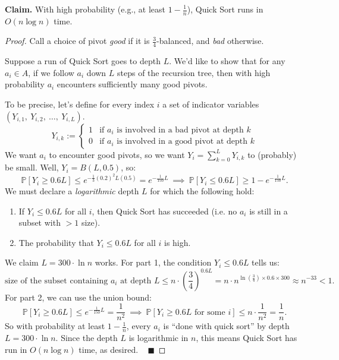 \textbf{Claim.} With high probability (e.g., at least $1 - \frac{1}{n}$), Quick Sort runs in $O(n \log n)$ time.

\begin{proof}
    Call a choice of pivot \emph{good} if it is $\frac{3}{4}$-balanced, and \emph{bad} otherwise.

    Suppose a run of Quick Sort goes to depth $L$.  We'd like to show that for any $a_i \in A$, if we follow $a_i$ down $L$ steps of the recursion tree, then with high probability $a_i$ encounters sufficiently many good pivots.
    
    To be precise, let's define for every index $i$ a set of indicator variables $(Y_{i, 1}, \ Y_{i, 2}, \ \dots, \ Y_{i, L})$.
    \[ Y_{i, k} := \begin{cases}
    1 & \text{if } a_i \text{ is involved in a bad pivot at depth } k \\
    0 & \text{if } a_i \text{ is involved in a good pivot at depth } k
    \end{cases} \]
    We want $a_i$ to encounter good pivots, so we want $Y_i = \sum_{k = 0}^L Y_{i, k}$ to (probably) be small.  Well, $Y_i = B(L, 0.5)$, so:
    \[ \mathbb{P}[Y_i \geq 0.6L] \leq e^{-\frac{1}{3} (0.2)^2 L (0.5)} = e^{-\frac{1}{150}L} ~ \implies ~ \mathbb{P}[Y_i \leq 0.6L] \geq 1 - e^{-\frac{1}{150}L}. \]
    We must declare a \emph{logarithmic} depth $L$ for which the following hold:
    \begin{enumerate}
        \item If $Y_i \leq 0.6L$ for all $i$, then Quick Sort has succeeded (i.e. no $a_i$ is still in a subset with $>1$ size).
        \item The probability that $Y_i \leq 0.6L$ for all $i$ is high.
    \end{enumerate}
    We claim $L = 300 \cdot \ln n$ works.  For part 1, the condition $Y_i \leq 0.6L$ tells us:
    \[ \text{size of the subset containing } a_i \text{ at depth } L \leq n \cdot \left(\dfrac{3}{4}\right)^{0.6L} = n \cdot n^{\ln \left(\frac{3}{4}\right) \times 0.6 \times 300} \approx n^{-33} < 1. \]
    For part 2, we can use the union bound:
    \[ \mathbb{P}[Y_i \geq 0.6L] \leq e^{-\frac{1}{150}L} = \dfrac{1}{n^2} ~ \implies ~  \mathbb{P}[Y_i \geq 0.6L \text{ for some } i] \leq n \cdot \dfrac{1}{n^2} = \dfrac{1}{n}. \]
    So with probability at least $1 - \frac{1}{n}$, every $a_i$ is ``done with quick sort'' by depth $L = 300 \cdot \ln n$.  Since the depth $L$ is logarithmic in $n$, this means Quick Sort has run in $O(n \log n)$ time, as desired. ~ $\blacksquare$
\end{proof}

